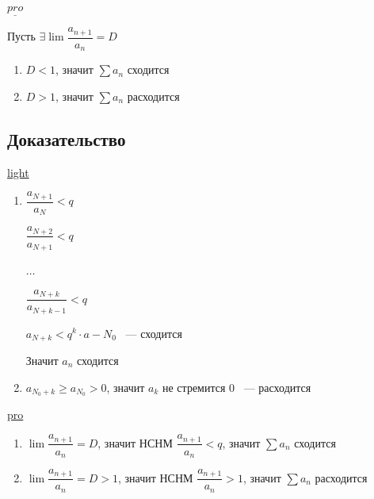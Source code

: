 \documentclass{article}
\begin{document}
            $\underline{pro}$
            
            Пусть $\exists \lim \dfrac{a_{n + 1}}{a_n} = D$
            
            \begin{enumerate}
            
                \item $D < 1$, значит $\sum a_n$ сходится
                
                \item $D > 1$, значит $\sum a_n$ расходится
                
            \end{enumerate}
    
        \subsection{Доказательство}
        
            \underline{light}
            
            \begin{enumerate}
            
                \item 
                
                    $\dfrac{a_{N + 1}}{a_N} < q$
                    
                    $\dfrac{a_{N + 2}}{a_{N + 1}} < q$
                    
                    $\ldots$
                    
                    $\dfrac{a_{N + k}}{a_{N + k - 1}} < q$
                    
                    $a_{N + k} < q^k \cdot a-{N_0}$ ~--- сходится
                    
                    Значит $a_n$ сходится
                    
                \item
                
                    $a_{N_0 + k} \geq a_{N_0} > 0$, значит $a_k$ не стремится $0$ ~--- расходится
                
            \end{enumerate}
            
            \underline{pro}
            
            \begin{enumerate}
            
                \item $\lim \dfrac{a_{n + 1}}{a_n} = D$, значит НСНМ $\dfrac{a_{n + 1}}{a_n} < q$, значит $\sum a_n$ сходится
                
                \item $\lim \dfrac{a_{n + 1}}{a_n} = D > 1$, значит НСНМ $\dfrac{a_{n + 1}}{a_n} > 1$, значит $\sum a_n$ расходится
                
            \end{enumerate}
            
\end{document}
